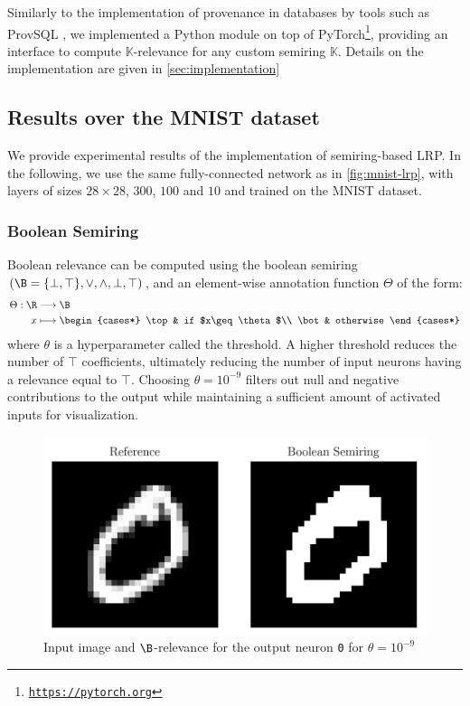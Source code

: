 \documentclass[twocolumn]{../cs-classes/cs-classes}
\newcommand*{\K}{\mathbb{K}}
\newcommand*{\1}{\digitsbb{1}}
\newcommand*{\0}{\digitsbb{0}}
\begin{document}
Similarly to the implementation of provenance in databases by tools such as ProvSQL \cite{provsql}, we implemented a Python module on top of PyTorch\footnote{\href{https://pytorch.org}{\texttt{https://pytorch.org}}}, providing an interface to compute $\K$-relevance for any custom semiring $\K$. Details on the implementation are given in \autoref{sec:implementation}

\subsection{Results over the MNIST dataset}
We provide experimental results of the implementation of semiring-based LRP. In the following, we use the same fully-connected network as in \autoref{fig:mnist-lrp}, with layers of sizes $28\times28$, $300$, $100$ and $10$ and trained on the MNIST dataset.
\subsubsection{Boolean Semiring}
Boolean relevance can be computed using the boolean semiring $(\B=\{\bot, \top\}, \lor, \land, \bot, \top)$, and an element-wise annotation function $\Theta$ of the form:
\begin{equation*}
    \begin{aligned}
        \Theta: \R&\longrightarrow \B\\
        x&\longmapsto \begin{cases*}
            \top & if $x\geq\theta$\\
            \bot & otherwise
        \end{cases*}
    \end{aligned}
\end{equation*}
where $\theta$ is a hyperparameter called the threshold. A higher threshold reduces the number of $\top$ coefficients, ultimately reducing the number of input neurons having a relevance equal to $\top$. Choosing $\theta=10^{-9}$ filters out null and negative contributions to the output while maintaining a sufficient amount of activated inputs for visualization.

\begin{figure}[H]
    \centering
    \includegraphics[width=.9\linewidth]{boolean.png}
    \caption{Input image and $\B$-relevance for the output neuron \texttt{0} for $\theta=10^{-9}$}
\end{figure}
\end{document}
